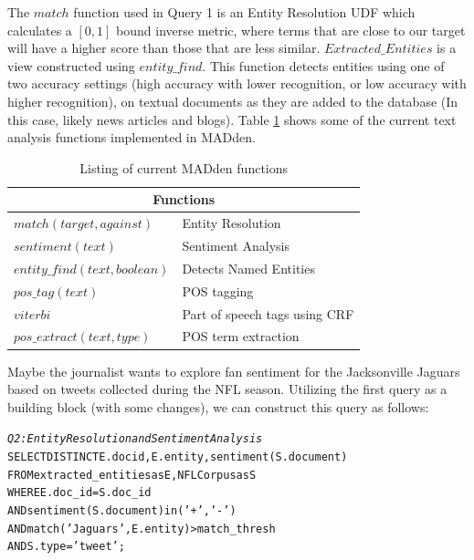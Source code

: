 The $match$ function used in Query 1 is an Entity
Resolution UDF which calculates a $[0,1]$ bound inverse metric, where terms that
are close to our target will have a higher score than those that are less
similar. $Extracted\_Entities$ is a view constructed using $entity\_find$. 
This function detects entities using one of two accuracy settings
(high accuracy with lower recognition, or low accuracy with higher
recognition), on textual documents as they are added to the database 
(In this case, likely news articles and blogs). Table \ref{tab:madfunct} shows some of
the current text analysis functions implemented in MADden. \\

\begin{table}
\begin{center}
\begin{tabular}{|l|l|}
\hline
\multicolumn{2}{|c|}{Functions}\\
\hline
$match(target, against)$ & Entity Resolution\\
\hline
$sentiment(text)$ & Sentiment Analysis\\
\hline
$entity\_find(text, boolean)$ & Detects Named Entities\\
\hline
$pos\_tag(text)$ & POS tagging\\
\hline
$viterbi$ & Part of speech tags using CRF  \\
\hline
$pos\_extract(text, type)$ & POS term extraction \\
\hline
\end{tabular}
\end{center}
\caption{Listing of current MADden functions}
\label{tab:madfunct}
\end{table}

Maybe the journalist wants to explore fan sentiment for the Jacksonville Jaguars
based on tweets collected during the NFL season. Utilizing the first 
query as a building block (with some changes), we can construct this 
query as follows:

\begin{small}
\begin{alltt}
\textit{Q2: Entity Resolution and Sentiment Analysis}
SELECT DISTINCT E.docid, E.entity, sentiment(S.document)
FROM extracted_entities as E, NFLCorpus as S
WHERE E.doc_id = S.doc_id
  AND sentiment(S.document) in ('+', '-')
  AND match('Jaguars', E.entity) > match\_thresh
  AND S.type = 'tweet';
\end{alltt}
\end{small}

